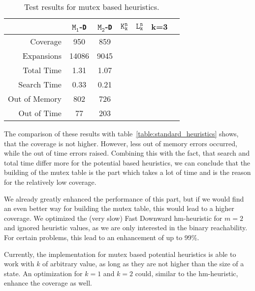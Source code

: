 
\begin{table}[h!]
    \begin{center}
        \begin{tabular}{|r|c|c|c|c|c|c|}
            \hline
            & \textbf{$\texttt{M}_\texttt{1}$-\texttt{D}} & \textbf{$\texttt{M}_\texttt{2}$-\texttt{D}} & \textbf{$\texttt{K}_\texttt{k}^\texttt{n}$} & \textbf{$\texttt{L}_\texttt{k}^\texttt{n}$} & k=3\\
            \hline \hline
            Coverage & 950 & 859 & & & \\ \hline
            Expansions & 14086 & 9045 & & & \\ \hline
            Total Time & 1.31 & 1.07 & & & \\ \hline
            Search Time & 0.33 & 0.21 & & & \\ \hline
            Out of Memory & 802 & 726 & & & \\ \hline
            Out of Time & 77 & 203 & & & \\ \hline
        \end{tabular}
        \caption{Test results for mutex based heuristics.}
        \label{table:mutex_based_heuristics}
    \end{center}
\end{table}

The comparison of these results with table~\ref{table:standard_heuristics} shows, that the coverage is not higher.
However, less out of memory errors occurred, while the out of time errors raised.
Combining this with the fact, that search and total time differ more for the potential based heuristics, we can conclude that the building of the mutex table is the part which takes a lot of time and is the reason for the relatively low coverage.

We already greatly enhanced the performance of this part, but if we would find an even better way for building the mutex table, this would lead to a higher coverage.
We optimized the (very slow) Fast Downward hm-heuristic for $m=2$ and ignored heuristic values, as we are only interested in the binary reachability.
For certain problems, this lead to an enhancement of up to 99\%. 

Currently, the implementation for mutex based potential heuristics is able to work with $k$ of arbitrary value, as long as they are not higher than the size of a state.
An optimization for $k=1$ and $k=2$ could, similar to the hm-heuristic, enhance the coverage as well.

